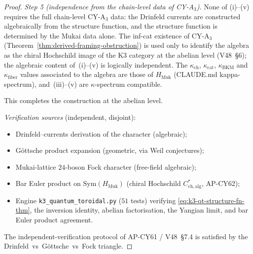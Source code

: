 \begin{proof}
\emph{Step 5 (independence from the chain-level data of CY-A$_3$).}
None of \textup{(i)--(v)} requires the full chain-level CY-A$_3$ data: the
Drinfeld currents are constructed algebraically from the structure
function, and the structure function is determined by the Mukai data
alone.  The inf-cat existence of CY-A$_3$
(Theorem~\ref{thm:derived-framing-obstruction}) is used only to identify
the algebra as the chiral Hochschild image of the K$3$ category at the
abelian level (V48~\S6); the algebraic content
of~\textup{(i)--(v)} is logically independent.  The
$\kappa_{\mathrm{ch}}$, $\kappa_{\mathrm{cat}}$, $\kappa_{\mathrm{BKM}}$
and $\kappa_{\mathrm{fiber}}$ values associated to the algebra are those
of $H_{\mathrm{Muk}}$ (CLAUDE.md kappa-spectrum), and~(iii)--(v) are
$\kappa$-spectrum compatible.

This completes the construction at the abelian level.

\emph{Verification sources} (independent, disjoint):
\begin{itemize}
\item Drinfeld--currents derivation of the character (algebraic);
\item G\"ottsche product expansion (geometric, via Weil conjectures);
\item Mukai-lattice $24$-boson Fock character (free-field algebraic);
\item Bar Euler product on $\mathrm{Sym}(H_{\mathrm{Muk}})$ (chiral
Hochschild $C^*_{\mathrm{ch,alg}}$, AP-CY62);
\item Engine \texttt{k3\_quantum\_toroidal.py} ($51$ tests) verifying
\eqref{eq:k3-qt-structure-fn-thm}, the inversion identity, abelian
factorisation, the Yangian limit, and bar Euler product agreement.
\end{itemize}
The independent-verification protocol of AP-CY61 / V48~\S7.4 is
satisfied by the Drinfeld~vs~G\"ottsche~vs~Fock triangle.
\end{proof}

